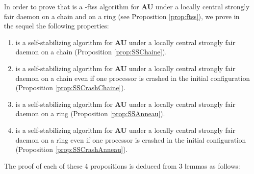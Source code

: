 \documentclass[11pt,english,letterpaper]{article}
\begin{document}
In order to prove that  is a -ftss algorithm for \textbf{AU} under a locally central strongly fair daemon on a chain and on a ring (see Proposition \ref{prop:ftss}), we prove in the sequel the following properties:

\begin{enumerate}
\item  is a self-stabilizing algorithm for \textbf{AU} under a locally central strongly fair daemon on a chain (Proposition \ref{prop:SSChaine}).
\item  is a self-stabilizing algorithm for \textbf{AU} under a locally central strongly fair daemon on a chain even if one processor is crashed in the initial configuration (Proposition \ref{prop:SSCrashChaine}).
\item  is a self-stabilizing algorithm for \textbf{AU} under a locally central strongly fair daemon on a ring (Proposition \ref{prop:SSAnneau}).
\item  is a self-stabilizing algorithm for \textbf{AU} under a locally central strongly fair daemon on a ring even if one processor is crashed in the initial configuration (Proposition \ref{prop:SSCrashAnneau}).
\end{enumerate}

The proof of each of these 4 propositions is deduced from 3 lemmas as follows:
\end{document}

